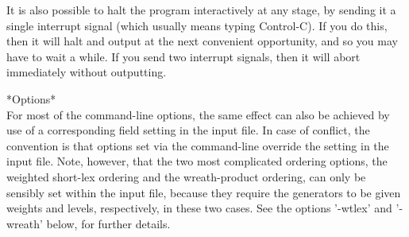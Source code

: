 It is also possible to halt the program interactively at any stage, by
sending it a single interrupt signal (which usually means typing Control-C).
If you do this, then it will halt and output at the next convenient
opportunity, and so you may have to wait a while. If you send two interrupt
signals, then it will abort immediately without outputting.

*Options*\\
For most of the command-line options, the same effect can also be achieved by 
use of a corresponding field setting in the input file. In case of conflict,
the convention is that options set via the command-line override the setting in
the input file. Note, however,  that the two most complicated ordering options,
the weighted short-lex ordering and the wreath-product ordering, can only
be sensibly set within the input file, because they require the generators
to be given weights and levels, respectively, in these two cases.
See the options '-wtlex' and '-wreath' below, for further details.

